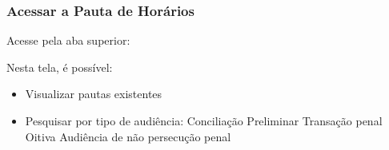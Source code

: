 \documentclass[letterpaper,10pt,brazil]{sphinxmanual}
\begin{document}
\subsubsection{Acessar a Pauta de Horários}
\label{\detokenize{projud_46_comopautaraudiencia:acessar-a-pauta-de-horarios}}
\sphinxAtStartPar
Acesse pela aba superior:

\sphinxAtStartPar
{}

\sphinxAtStartPar
Nesta tela, é possível:
\begin{itemize}
\item {} 
\sphinxAtStartPar
Visualizar pautas existentes

\item {} 
\sphinxAtStartPar
Pesquisar por tipo de audiência:
\sphinxhyphen{} Conciliação
\sphinxhyphen{} Preliminar
\sphinxhyphen{} Transação penal
\sphinxhyphen{} Oitiva
\sphinxhyphen{} Audiência de não persecução penal

\end{itemize}
\end{document}
